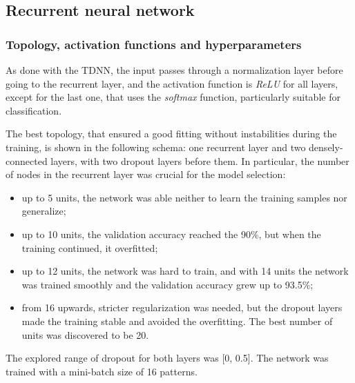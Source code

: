 \subsection{Recurrent neural network}
\subsubsection{Topology, activation functions and hyperparameters}
As done with the TDNN, the input passes through a normalization layer before going to the recurrent layer, and the activation function is \textit{ReLU} for all layers, except for the last one, that uses the \textit{softmax} function, particularly suitable for classification.
\bigbreak

The best topology, that ensured a good fitting without instabilities during the training, is shown in the following schema: one recurrent layer and two densely-connected layers, with two dropout layers before them. In particular, the number of nodes in the recurrent layer was crucial for the model selection:
\begin{itemize}
	\item up to 5 units, the network was able neither to learn the training samples nor generalize;
	\item up to 10 units, the validation accuracy reached the 90\%, but when the training continued, it overfitted;
	\item up to 12 units, the network was hard to train, and with 14 units the network was trained smoothly and the validation accuracy grew up to 93.5\%;
	\item from 16 upwards, stricter regularization was needed, but the dropout layers made the training stable and avoided the overfitting. The best number of units was discovered to be 20.
\end{itemize}
The explored range of dropout for both layers was [0, 0.5]. The network was trained with a mini-batch size of 16 patterns.

